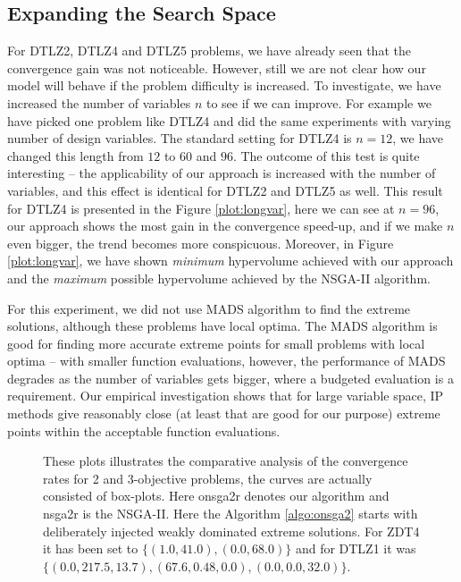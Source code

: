 \documentclass{sig-alternate-05-2015}
\begin{document}
\subsection{Expanding the Search Space} 
\label{subsec:longvar}
For DTLZ2, DTLZ4 and DTLZ5 problems, we have already seen that the convergence gain was not noticeable. However, still we are not clear how our model will behave if the problem difficulty is increased. To investigate, we have increased the number of variables \(n\) to see if we can improve. For example we have picked one problem like DTLZ4 and did the same experiments with varying number of design variables. The standard setting for DTLZ4 is \(n = 12\), we have changed this length from \(12\) to \(60\) and \(96\). The outcome of this test is quite interesting -- the applicability of our approach is increased with the number of variables, and this effect is identical for DTLZ2 and DTLZ5 as well. This result for DTLZ4 is presented in the Figure \ref{plot:longvar}, here we can see at \(n = 96\), our approach shows the most gain in the convergence speed-up, and if we make \(n\) even bigger, the trend becomes more conspicuous. Moreover, in Figure \ref{plot:longvar}, we have shown \textit{minimum} hypervolume achieved with our approach and the \textit{maximum} possible hypervolume achieved by the NSGA-II algorithm.

For this experiment, we did not use MADS algorithm to find the extreme solutions, although these problems have local optima. The MADS algorithm is good for finding more accurate extreme points for small problems with local optima -- with smaller function evaluations, however, the performance of MADS degrades as the number of variables gets bigger, where a budgeted evaluation is a requirement. Our empirical investigation shows that for large variable space, IP methods give reasonably close (at least that are good for our purpose) extreme points within the acceptable function evaluations.

%
\begin{figure*}[!htp]
	\centering
	\hfill
	\caption{These plots illustrates the comparative analysis of the convergence rates for 2 and 3-objective problems, the curves are actually consisted of box-plots. Here onsga2r denotes our algorithm and nsga2r is the NSGA-II. Here the Algorithm \ref{algo:onsga2} starts with deliberately injected weakly dominated extreme solutions. For ZDT4 it has been set to \(\{(1.0, 41.0), (0.0, 68.0)\}\) and for DTLZ1 it was \(\{(0.0, 217.5, 13.7),(67.6, 0.48, 0.0),(0.0, 0.0, 32.0)\}\).}
	\label{plot:weak-hv}
\end{figure*}
%
\end{document}
